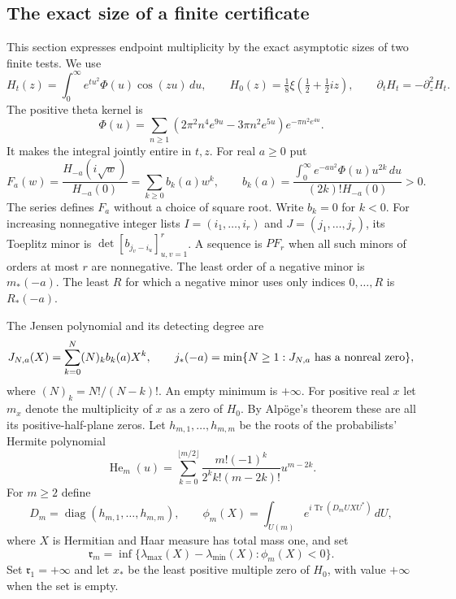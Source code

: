 \subsection{The exact size of a finite certificate}

This section expresses endpoint multiplicity by the exact asymptotic sizes of two finite tests.
We use
\[
 H_t(z)=\int_0^\infty e^{tu^2}\Phi(u)\cos(zu)\,du,
 \qquad H_0(z)=\tfrac18\xi(\tfrac12+\tfrac12iz),
 \qquad \partial_tH_t=-\partial_z^2H_t.
\]
The positive theta kernel is
\[
 \Phi(u)=\sum_{n\ge1}
 (2\pi^2n^4e^{9u}-3\pi n^2e^{5u})e^{-\pi n^2e^{4u}}.
\]
It makes the integral jointly entire in $t,z$.  For real $a\ge0$ put
\[
 F_a(w)=\frac{H_{-a}(i\sqrt w)}{H_{-a}(0)}
       =\sum_{k\ge0}b_k(a)w^k,
 \qquad
 b_k(a)=\frac{\int_0^\infty e^{-au^2}\Phi(u)u^{2k}\,du}
                   {(2k)!H_{-a}(0)}>0.
\]
The series defines $F_a$ without a choice of square root.  Write $b_k=0$ for $k<0$.
For increasing nonnegative integer lists $I=(i_1,\ldots,i_r)$ and
$J=(j_1,\ldots,j_r)$, its Toeplitz minor is
$\det[b_{j_v-i_u}]_{u,v=1}^r$.  A sequence is $PF_r$ when all such
minors of orders at most $r$ are nonnegative.  The least order of a
negative minor is $m_*(-a)$.  The least $R$ for which a negative minor
uses only indices $0,\ldots,R$ is $R_*(-a)$.

The Jensen polynomial and its detecting degree are
\[
 J_{N,a}(X)=\sum_{k=0}^N(N)_k b_k(a)X^k,
 \qquad
 j_*(-a)=\min\{N\ge1:J_{N,a}\hbox{ has a nonreal zero}\},
\]
where $(N)_k=N!/(N-k)!$.  An empty minimum is $+\infty$.
For positive real $x$ let $m_x$ denote the multiplicity of $x$ as a zero of $H_0$.
By Alp\"oge's theorem these are all its positive-half-plane zeros.
Let $h_{m,1},\ldots,h_{m,m}$ be the roots of the probabilists' Hermite
polynomial
\[
 \operatorname{He}_m(u)=
 \sum_{k=0}^{\lfloor m/2\rfloor}
 \frac{m!(-1)^k}{2^k k!(m-2k)!}u^{m-2k}.
\]
For $m\ge2$ define
\[
 D_m=\operatorname{diag}(h_{m,1},\ldots,h_{m,m}),\qquad
 \phi_m(X)=\int_{U(m)}e^{i\operatorname{Tr}(D_mUXU^*)}\,dU,
\]
where $X$ is Hermitian and Haar measure has total mass one, and set
\[
 \mathfrak r_m=\inf\{\lambda_{\max}(X)-\lambda_{\min}(X):\phi_m(X)<0\}.
\]
Set $\mathfrak r_1=+\infty$ and let $x_*$ be the least positive multiple
zero of $H_0$, with value $+\infty$ when the set is empty.

